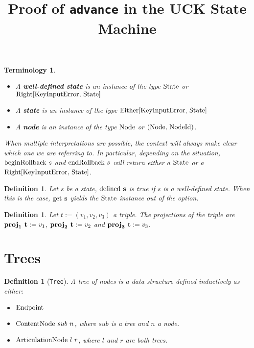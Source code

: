 \documentclass{article}
\title{\huge Proof of \texttt{advance} in the UCK State Machine}
\date{}
\author{}
\newtheorem{definition}[lemma]{Definition}
\newtheorem*{term}{Terminology}
\newcommand{\textfun}[1]{\textup{#1}}
\newcommand{\textcode}[1]{\texttt{#1}}
\newcommand{\bolddef}[1]{\textbf{\ensuremath{\mathbf{#1}}}}
\newcommand{\nilNode}{\textfun{Endpoint}}
\newcommand{\contentNode}[2]{\textfun{ContentNode}\ #1\ #2}
\newcommand{\artNode}[2]{\textfun{ArticulationNode}\ #1\ #2}
\newcommand{\beginRb}[1]{\textfun{beginRollback}\ #1}
\newcommand{\enRb}[1]{\textfun{endRollback}\ #1}
\newcommand{\defined}[1]{\textfun{defined}\ #1}
\newcommand{\get}[1]{\textfun{get}\ #1}
\newcommand{\fst}[1]{\textfun{proj}_1\ #1}
\newcommand{\snd}[1]{\textfun{proj}_2\ #1}
\newcommand{\trd}[1]{\textfun{proj}_3\ #1}
\newcommand{\state}{\textfun{State}}
\begin{document}
\maketitle


\begin{term}\ 
    \begin{itemize}
        \item A \textbf{well-defined state} is an instance of the type $\state$ or $\textfun{Right[KeyInputError, \state]}$
        \item A \textbf{state} is an instance of the type $\textfun{Either[KeyInputError, \state]}$
        \item A \textbf{node} is an instance of the type $\textfun{Node}$ or $\textfun{(Node, NodeId)}$.
    \end{itemize}
    When multiple interpretations are possible, the context will always make clear which one we are referring to.
    In particular, depending on the situation, $\beginRb{s}$ and $\enRb{s}$ will return either a $\state$ or a $\textfun{Right[KeyInputError, \state]}$.
\end{term}

\begin{definition}
    Let $s$ be a state, \bolddef{\defined{s}} is true if $s$ is a well-defined state.
    When this is the case, \bolddef{\get{s}} yields the $\textfun{State}$ instance out of the option.
\end{definition}

\begin{definition}
    Let $t := (v_1, v_2, v_3)$ a triple. The projections of the triple are $\bolddef{\fst{t}} := v_1$, $\bolddef{\snd{t}} := v_2$ and $\bolddef{\trd{t}} := v_3$.
\end{definition}

















\section*{Trees}

\begin{definition}[\textcode{Tree}]
    A tree of nodes is a data structure defined inductively as either:
    \begin{itemize}
        \item $\nilNode$
        \item $\contentNode{sub}{n}$, where $sub$ is a tree and $n$ a node.
        \item $\artNode{l}{r}$, where $l$ and $r$ are both trees.
    \end{itemize}
\end{definition}
\end{document}
